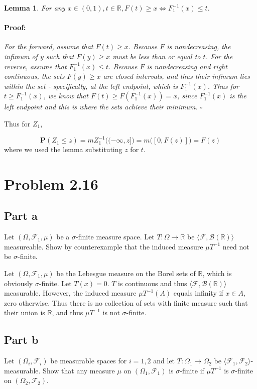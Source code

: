 \documentclass{article}
\newenvironment{proof}{\paragraph{Proof:}}{\hfill$\square$}
\newtheorem{lemma}[theorem]{Lemma}
\newcommand{\R}{\mathbb{R}}
\newcommand{\F}{\mathcal{F}}
\newcommand{\B}{\mathcal{B}}
\newcommand{\prob}{\boldsymbol{P}}
\begin{document}
\begin{lemma}
For any $x \in (0, 1), t \in \R, F(t) \geq x \Leftrightarrow F_1^{-1}(x) \leq t$.
\begin{proof}
For the forward, assume that $F(t) \geq x$. Because $F$ is nondecreasing, the infimum of $y$ such that $F(y) \geq x$ must be less than or equal to $t$. For the reverse, assume that $F_1^{-1}(x) \leq t$. Because $F$ is nondecreasing and right continuous, the sets $F(y) \geq x$ are closed intervals, and thus their infimum lies within the set - specifically, at the left endpoint, which is $F_1^{-1}(x)$. Thus for $t \geq F_1^{-1}(x)$, we know that $F(t) \geq F(F_1^{-1}(x)) = x$, since $F_1^{-1}(x)$ is the left endpoint and this is where the sets achieve their minimum.
\end{proof}
\end{lemma}

Thus for $Z_1$,

\[
\prob(Z_1 \leq z) = mZ_1^{-1}\bigl( (-\infty, z] \bigl) = m\bigl( [0, F(z)] \bigl) = F(z)
\]
where we used the lemma substituting $z$ for $t$.

\section*{Problem 2.16}

\subsection*{Part a}

Let $(\Omega, \F_1, \mu)$ be a $\sigma$-finite measure space. Let $T: \Omega \rightarrow \R$ be $\langle \F, \B(\R) \rangle$ measureable. Show by counterexample that the induced measure $\mu T^{-1}$ need not be $\sigma$-finite.

Let $(\Omega, \F_1, \mu)$ be the Lebesgue measure on the Borel sets of $\R$, which is obviously $\sigma$-finite. Let $T(x) = 0$. $T$ is continuous and thus $\langle \F, \B(\R) \rangle$ measurable. However, the induced measure $\mu T^{-1}(A)$ equals infinity if $x \in A$, zero otherwise. Thus there is no collection of sets with finite measure such that their union is $\R$, and thus $\mu T^{-1}$ is not $\sigma$-finite.

\subsection*{Part b}

Let $(\Omega_i, \F_i)$ be measurable spaces for $i = 1, 2$ and let $T: \Omega_1 \rightarrow \Omega_2$ be $\langle \F_1, \F_2 \rangle$-measurable. Show that any measure $\mu$ on $(\Omega_1, \F_1)$ is $\sigma$-finite if $\mu T^{-1}$ is $\sigma$-finite on $(\Omega_2, \F_2)$.
\end{document}
